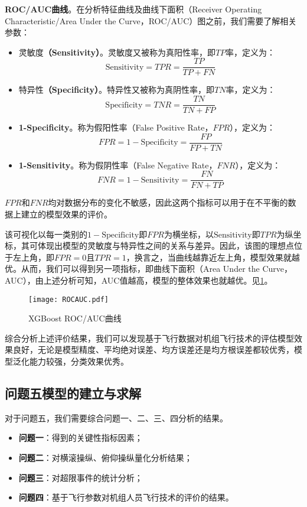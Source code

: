 \documentclass{MathorCupModeling}
\begin{document}
\textbf{ROC/AUC曲线}。在分析特征曲线及曲线下面积（Receiver Operating Characteristic/Area Under the Curve，ROC/AUC）图之前，我们需要了解相关参数：
		\begin{itemize}
			\item {\heiti 灵敏度}\textbf{（Sensitivity）}。灵敏度又被称为真阳性率，即$TP$率，定义为：
			\begin{equation}
				\mathrm{Sensitivity}=TPR=\frac{TP}{TP+FN} \label{Sensitivity}
			\end{equation}
			\item {\heiti 特异性}\textbf{（Specificity）}。特异性又被称为真阴性率，即$TN$率，定义为：
			\begin{equation}
				\mathrm{Specificity}=TNR=\frac{TN}{TN+FP} \label{Specificity}
			\end{equation}
			\item \textbf{1-Specificity}。称为假阳性率（False Positive Rate，$FPR$），定义为：
			\begin{equation}
				FPR=1-\mathrm{Specificity}=\frac{FP}{FP+TN} \label{FPR}
			\end{equation}
			\item \textbf{1-Sensitivity}。称为假阴性率（False Negative Rate，$FNR$），定义为：
			\begin{equation}
				FNR=1-\mathrm{Sensitivity}=\frac{FN}{FN+TP} \label{FNR}
			\end{equation}
		\end{itemize}
		$FPR$和$FNR$均对数据分布的变化不敏感\textcolor{blue}{\cite{Paper:ROCAUC}}，因此这两个指标可以用于在不平衡的数据上建立的模型效果的评价。
		
该可视化以每一类别的$1-\mathrm{Specificity}$即$FPR$为横坐标，以$\mathrm{Sensitivity}$即$TPR$为纵坐标，其可体现出模型的灵敏度与特异性之间的关系与差异。因此，该图的理想点位于左上角，即$FPR=0$且$TPR=1$，换言之，当曲线越靠近左上角，模型效果就越优。从而，我们可以得到另一项指标，即曲线下面积（Area Under the Curve，AUC），由上述分析可知，AUC值越高，模型的整体效果也就越优。见\textcolor{blue}{\cref{fig:ROCAUC}}。
		\begin{figure}[H]
			\centering
			\texttt{[image: ROCAUC.pdf]}
			\caption{XGBoost ROC/AUC曲线}
			\label{fig:ROCAUC}
		\end{figure}

综合分析上述评价结果，我们可以发现基于飞行数据对机组飞行技术的评估模型效果良好，无论是模型精度、平均绝对误差、均方误差还是均方根误差都较优秀，模型泛化能力较强，分类效果优秀。
  
	\subsection{问题五模型的建立与求解}
对于问题五，我们需要综合问题一、二、三、四分析的结果。
\begin{itemize}
	\item \textbf{问题一}：得到的关键性指标因素；
	\item \textbf{问题二}：对横滚操纵、俯仰操纵量化分析结果；
	\item \textbf{问题三}：对超限事件的统计分析；
	\item \textbf{问题四}：基于飞行参数对机组人员飞行技术的评价的结果。
\end{itemize}
\end{document}
